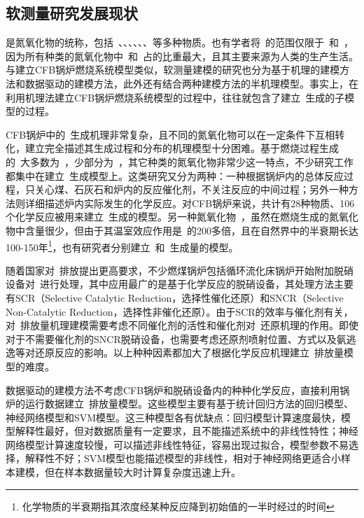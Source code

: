 \subsection{软测量研究发展现状}
是氮氧化物的统称，包括~、、、、、、等多种物质。也有学者将~的范围仅限于~和~，因为所有种类的氮氧化物中~和~占的比重最大，且其主要来源为人类的生产生活\cite{Agency1999Nitrogen}。与建立CFB锅炉燃烧系统模型类似，软测量建模的研究也分为基于机理的建模方法和数据驱动的建模方法，此外还有结合两种建模方法的半机理模型。事实上，在利用机理法建立CFB锅炉燃烧系统模型的过程中，往往就包含了建立~生成的子模型的过程。

CFB锅炉中的~生成机理非常复杂，且不同的氮氧化物可以在一定条件下互相转化，建立完全描述其生成过程和分布的机理模型十分困难。基于燃烧过程生成的~大多数为~，少部分为~，其它种类的氮氧化物非常少这一特点，不少研究工作都集中在建立~生成模型上。这类研究又分为两种：一种根据锅炉内的总体反应过程，只关心煤、石灰石和炉内的反应催化剂，不关注反应的中间过程；另外一种方法则详细描述炉内实际发生的化学反应\cite{johnsson1990modelling}。对CFB锅炉来说，共计有28种物质、106个化学反应被用来建立~生成的模型\cite{talukdar1995simplified}。另一种氮氧化物~，虽然在燃烧生成的氮氧化物中含量很少，但由于其温室效应作用是~的200多倍，且在自然界中的半衰期长达100-150年\footnote{化学物质的半衰期指其浓度经某种反应降到初始值的一半时经过的时间}，也有研究者分别建立~和~生成量的模型\cite{liukkonen2012dynamic}。

随着国家对~排放提出更高要求，不少燃煤锅炉包括循环流化床锅炉开始附加脱硝设备对~进行处理，其中应用最广的是基于化学反应的脱硝设备，其处理方法主要有SCR（Selective Catalytic Reduction，选择性催化还原）和SNCR（Selective Non-Catalytic Reduction，选择性非催化还原）。由于SCR的效率与催化剂有关，对~排放量机理建模需要考虑不同催化剂的活性和催化剂对~还原机理的作用。即使对于不需要催化剂的SNCR脱硝设备，也需要考虑还原剂喷射位置、方式以及氨逃逸等对还原反应的影响\cite{李穹2013sncr}。以上种种因素都加大了根据化学反应机理建立~排放量模型的难度。

数据驱动的建模方法不考虑CFB锅炉和脱硝设备内的种种化学反应，直接利用锅炉的运行数据建立~排放量模型。这些模型主要有基于统计回归方法的回归模型、神经网络模型和SVM模型。这三种模型各有优缺点：回归模型计算速度最快，模型解释性最好，但对数据质量有一定要求，且不能描述系统中的非线性特性；神经网络模型计算速度较慢，可以描述非线性特征，容易出现过拟合，模型参数不易选择，解释性不好；SVM模型也能描述模型的非线性，相对于神经网络更适合小样本建模，但在样本数据量较大时计算复杂度迅速上升。

